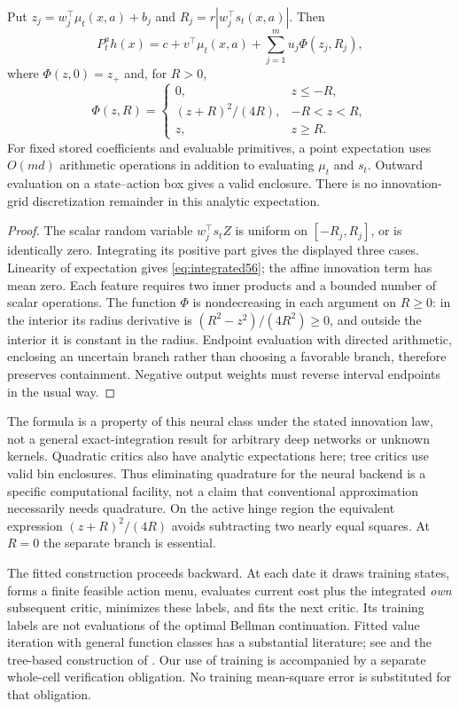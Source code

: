 \begin{lemma}\label{lem:integrated56}
Put $z_j=w_j^\top \mu_t(x,a)+b_j$ and $R_j=r|w_j^\top s_t(x,a)|$. Then
\begin{equation}\label{eq:integrated56}
 P_t^ah(x)=c+v^\top \mu_t(x,a)+\sum_{j=1}^m u_j\Phi(z_j,R_j),
\end{equation}
where $\Phi(z,0)=z_+$ and, for $R>0$,
\[
 \Phi(z,R)=
 \begin{cases}
 0,&z\le -R,\\
 (z+R)^2/(4R),&-R<z<R,\\
 z,&z\ge R.
 \end{cases}
\]
For fixed stored coefficients and evaluable primitives, a point expectation uses $O(md)$ arithmetic operations in addition to evaluating $\mu_t$ and $s_t$. Outward evaluation on a state--action box gives a valid enclosure. There is no innovation-grid discretization remainder in this analytic expectation.
\end{lemma}
\begin{proof}
The scalar random variable $w_j^\top s_t Z$ is uniform on $[-R_j,R_j]$, or is identically zero. Integrating its positive part gives the displayed three cases. Linearity of expectation gives \eqref{eq:integrated56}; the affine innovation term has mean zero. Each feature requires two inner products and a bounded number of scalar operations. The function $\Phi$ is nondecreasing in each argument on $R\ge0$: in the interior its radius derivative is $(R^2-z^2)/(4R^2)\ge0$, and outside the interior it is constant in the radius. Endpoint evaluation with directed arithmetic, enclosing an uncertain branch rather than choosing a favorable branch, therefore preserves containment. Negative output weights must reverse interval endpoints in the usual way.
\end{proof}

The formula is a property of this neural class under the stated innovation law, not a general exact-integration result for arbitrary deep networks or unknown kernels. Quadratic critics also have analytic expectations here; tree critics use valid bin enclosures. Thus eliminating quadrature for the neural backend is a specific computational facility, not a claim that conventional approximation necessarily needs quadrature. On the active hinge region the equivalent expression $(z+R)^2/(4R)$ avoids subtracting two nearly equal squares. At $R=0$ the separate branch is essential.

The fitted construction proceeds backward. At each date it draws training states, forms a finite feasible action menu, evaluates current cost plus the integrated \emph{own} subsequent critic, minimizes these labels, and fits the next critic. Its training labels are not evaluations of the optimal Bellman continuation. Fitted value iteration with general function classes has a substantial literature; see \citet{munos2008} and the tree-based construction of \citet{ernst2005}. Our use of training is accompanied by a separate whole-cell verification obligation. No training mean-square error is substituted for that obligation.

